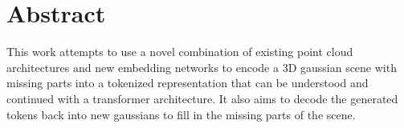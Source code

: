 
\chapter*{Abstract}
\label{sec:abstract}
This work attempts to use a novel combination of existing point cloud architectures and new embedding networks to encode a 3D gaussian scene with missing parts into a tokenized representation that can be understood and continued with a transformer architecture. It also aims to decode the generated tokens back into new gaussians to fill in the missing parts of the scene. 
